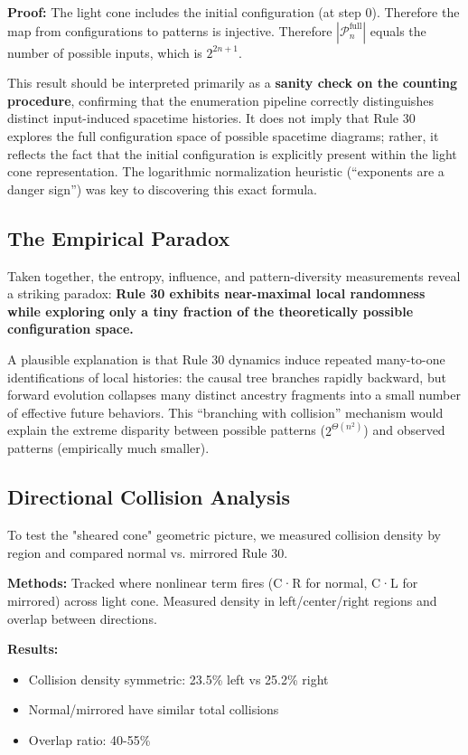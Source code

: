 \documentclass[11pt]{article}
\begin{document}
\textbf{Proof:} The light cone includes the initial configuration (at step 0). Therefore the map from configurations to patterns is injective. Therefore $|\mathcal{P}_n^{\text{full}}|$ equals the number of possible inputs, which is $2^{2n+1}$.

This result should be interpreted primarily as a \textbf{sanity check on the counting procedure}, confirming that the enumeration pipeline correctly distinguishes distinct input-induced spacetime histories. It does not imply that Rule 30 explores the full configuration space of possible spacetime diagrams; rather, it reflects the fact that the initial configuration is explicitly present within the light cone representation. The logarithmic normalization heuristic (``exponents are a danger sign'') was key to discovering this exact formula.

\subsection{The Empirical Paradox}

Taken together, the entropy, influence, and pattern-diversity measurements reveal a striking paradox: \textbf{Rule 30 exhibits near-maximal local randomness while exploring only a tiny fraction of the theoretically possible configuration space.}

A plausible explanation is that Rule 30 dynamics induce repeated many-to-one identifications of local histories: the causal tree branches rapidly backward, but forward evolution collapses many distinct ancestry fragments into a small number of effective future behaviors. This ``branching with collision'' mechanism would explain the extreme disparity between possible patterns ($2^{\Theta(n^2)}$) and observed patterns (empirically much smaller).

\subsection{Directional Collision Analysis}

To test the "sheared cone" geometric picture, we measured collision density 
by region and compared normal vs. mirrored Rule 30.

\textbf{Methods:} Tracked where nonlinear term fires (C·R for normal, C·L 
for mirrored) across light cone. Measured density in left/center/right 
regions and overlap between directions.

\textbf{Results:} 
\begin{itemize}
    \item Collision density symmetric: 23.5\% left vs 25.2\% right
    \item Normal/mirrored have similar total collisions
    \item Overlap ratio: 40-55\%
\end{itemize}
\end{document}
